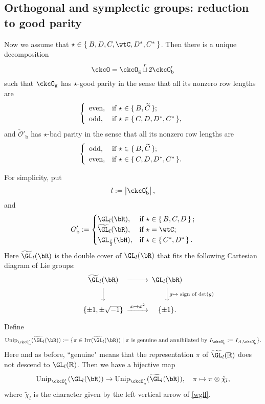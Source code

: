 \documentclass[12pt,a4paper]{amsart}
\def\abs#1{\left|{#1}\right|}
\newcommand{\CO}{{\mathcal {O}}}
\newcommand{\R}{\mathbb R}
\numberwithin{equation}{section}
\theoremstyle{remark}
\def\Irr{\mathrm{Irr}}
\def\Unip{\mathrm{Unip}}
\def\cuprow{{\stackrel{r}{\sqcup}}}
\def\cuprow{{\,\stackrel{r}{\sqcup}\,}}
\def\ckcOpb{\ckcO'_{\mathrm b}}
\def\ckcOg{\ckcO_{\mathrm g}}
\def\Gpb{G'_{\mathrm b}}
\begin{document}
\subsection{Orthogonal and symplectic groups: reduction to good parity}

Now we assume that
$\star\in \Set{ B, D, C, \wtC, D^*, C^*}$.
Then there is a unique decomposition
\[
  \ckcO=\ckcOg \cuprow 2\ckcOpb
\]
such that $\ckcOg$ has $\star$-good parity in the sense that all its nonzero row
lengths are
\[
  \left\{
    \begin{array}{ll}
      \textrm{even}, &\hbox{if $\star\in \set{B, \widetilde C}$}; \smallskip\\
      \textrm{odd}, &\hbox{if $\star\in \set{C, D, D^*, C^*}$},
    \end{array}
  \right.
\]
and $\check \CO'_{\mathrm b}$ has $\star$-bad parity in the sense that all its
nonzero row lengths are
\[
  \left\{
    \begin{array}{ll}
      \textrm{odd}, &\hbox{if  $\star\in \set{B, \widetilde C}$}; \smallskip\\
      \textrm{even}, &\hbox{if  $\star\in \set{C, D, D^*, C^*}$}.
    \end{array}
  \right.
\]

For simplicity, put
\[
  l:=\abs{\ckcOpb},
\]
and
\[
  \Gpb := \begin{cases}
    \GL_{l}(\bR), & \text{if } \star \in \set{B,C,D}; \\
       \widetilde{ \GL}_{l}(\bR), & \text{if } \star =\wtC; \\
    \GL_{\frac{l}{2}}(\bH), & \text{if } \star \in \set{C^{*},D^{*}}. \\
  \end{cases}
\]
Here $ \widetilde{ \GL}_{l}(\bR)$ is the double cover of $ \GL_{l}(\bR)$ that fits the following Cartesian diagram of Lie groups:
\begin{equation}\label{wgll}
\begin{CD}
 \widetilde{ \GL}_{l}(\bR)@>>>  \GL_{l}(\bR)\\
  @VVV @VV g\mapsto \textrm{ sign of $\det(g)$} V\\
  \{\pm 1, \pm \sqrt{-1}\} @> x\mapsto x^2 >> \{\pm 1\}. \\
\end{CD}
\end{equation}

Define
 \[
      \Unip_{\ckcOpb}(\widetilde{ \GL}_{l}(\bR)):=
       \{\pi\in \Irr(\widetilde{ \GL}_{l}(\bR))\mid \pi \textrm{ is genuine  and annihilated by } I_{\ckcOpb}:= I_{A, \ckcOpb}\}.
       \]
        Here and as before, ``genuine" means that the representation $\pi$ of
 $\widetilde \GL_{l}(\R)$ does not descend to $\GL_{l}(\R)$. Then we have a bijective map
 \[
    \Unip_{\ckcOpb}(\GL_{l}(\bR))\rightarrow  \Unip_{\ckcOpb}(\widetilde{ \GL}_{l}(\bR)), \quad \pi\mapsto \pi\otimes \tilde \chi_l,
 \]
 where $\tilde \chi_l$ is the character given by the left vertical arrow of \eqref{wgll}.
\end{document}
